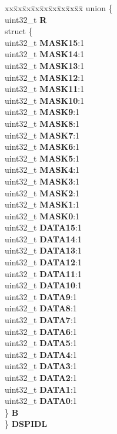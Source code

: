 \begin{DoxyCompactItemize}
\begin{tabbing}
\end{tabbing}\item 
\mbox{\label{structSIU__tag_a3acf124c17423dfa4871cc848b6d568e}} 
\begin{tabbing}
xx\=xx\=xx\=xx\=xx\=xx\=xx\=xx\=xx\=\kill
union \{\\
\>uint32\_t {\bfseries R}\\
\>struct \{\\
\>\>uint32\_t {\bfseries MASK15}:1\\
\>\>uint32\_t {\bfseries MASK14}:1\\
\>\>uint32\_t {\bfseries MASK13}:1\\
\>\>uint32\_t {\bfseries MASK12}:1\\
\>\>uint32\_t {\bfseries MASK11}:1\\
\>\>uint32\_t {\bfseries MASK10}:1\\
\>\>uint32\_t {\bfseries MASK9}:1\\
\>\>uint32\_t {\bfseries MASK8}:1\\
\>\>uint32\_t {\bfseries MASK7}:1\\
\>\>uint32\_t {\bfseries MASK6}:1\\
\>\>uint32\_t {\bfseries MASK5}:1\\
\>\>uint32\_t {\bfseries MASK4}:1\\
\>\>uint32\_t {\bfseries MASK3}:1\\
\>\>uint32\_t {\bfseries MASK2}:1\\
\>\>uint32\_t {\bfseries MASK1}:1\\
\>\>uint32\_t {\bfseries MASK0}:1\\
\>\>uint32\_t {\bfseries DATA15}:1\\
\>\>uint32\_t {\bfseries DATA14}:1\\
\>\>uint32\_t {\bfseries DATA13}:1\\
\>\>uint32\_t {\bfseries DATA12}:1\\
\>\>uint32\_t {\bfseries DATA11}:1\\
\>\>uint32\_t {\bfseries DATA10}:1\\
\>\>uint32\_t {\bfseries DATA9}:1\\
\>\>uint32\_t {\bfseries DATA8}:1\\
\>\>uint32\_t {\bfseries DATA7}:1\\
\>\>uint32\_t {\bfseries DATA6}:1\\
\>\>uint32\_t {\bfseries DATA5}:1\\
\>\>uint32\_t {\bfseries DATA4}:1\\
\>\>uint32\_t {\bfseries DATA3}:1\\
\>\>uint32\_t {\bfseries DATA2}:1\\
\>\>uint32\_t {\bfseries DATA1}:1\\
\>\>uint32\_t {\bfseries DATA0}:1\\
\>\} {\bfseries B}\\
\} {\bfseries DSPIDL}\\


\end{tabbing}
\end{DoxyCompactItemize}
